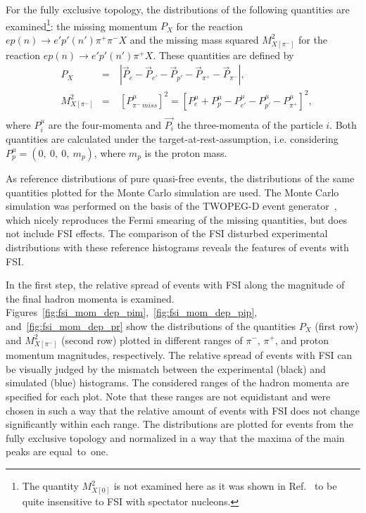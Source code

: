 For the fully exclusive topology, the distributions of the following quantities are examined\footnote[5]{The quantity $M^{2}_{X[0]}$ is not examined here as it was shown in Ref.~\cite{note_mm_distr} to be quite insensitive to FSI with spectator nucleons.}: the missing momentum $P_{X}$ for the reaction $ep(n)\rightarrow e'p'(n')\pi^{+}\pi^{-}X$ and the missing mass squared $M^{2}_{X[\pi^{-}]}$ for the reaction $ep(n)\rightarrow e'p'(n')\pi^{+}X$. These quantities are defined by\vspace{-1.25em}
\begin{equation}
\begin{aligned}
&P_{X}&=&~|\overrightarrow{P}_{e} - \overrightarrow{P}_{e'}- \overrightarrow{P}_{p'} - \overrightarrow{P}_{\pi^{+}} - \overrightarrow{P}_{\pi^{-}}|,\\[-3pt]
&M_{X[\pi^{-}]}^{2}&=&~[P_{\pi^{-}~miss}^{\mu}]^{2}=[P_{e}^{\mu} + P_{p}^{\mu}- P_{e'}^{\mu}- P_{p'}^{\mu}-  P_{\pi^{+}}^{\mu}]^{2},\\[-10pt]
\end{aligned}\label{eq:excl_top_quant2}
\end{equation}%
where $P_{i}^{\mu}$ are the four-momenta and $\overrightarrow{P_{i}}$ the three-momenta of the particle $i$. Both quantities are calculated under the target-at-rest-assumption, i.e. considering $P^{\mu}_{p} = (0,~0,~0,~m_{p})$, where $m_{p}$ is the proton mass.

As reference distributions of pure quasi-free events, the distributions of the same quantities plotted for the Monte Carlo simulation are used. The Monte Carlo simulation was performed on the basis of the TWOPEG-D event generator~\cite{twopeg-d}, which nicely reproduces the Fermi smearing of the missing quantities, but does not include FSI effects. The comparison of the FSI disturbed experimental distributions with these reference histograms reveals the features of events with FSI. 


In the first step, the relative spread of events with FSI along the magnitude of the final hadron momenta is examined. Figures~\ref{fig:fsi_mom_dep_pim},~\ref{fig:fsi_mom_dep_pip}, and~\ref{fig:fsi_mom_dep_pr} show the distributions of the quantities $P_{X}$ (first row) and $M^{2}_{X[\pi^{-}]}$ (second row) plotted in different ranges of $\pi^{-}$, $\pi^{+}$, and proton momentum magnitudes, respectively. The relative spread of events with FSI can be visually judged by the mismatch between the experimental (black) and simulated (blue) histograms. The considered ranges of the hadron momenta are specified for each plot. Note that these ranges are not equidistant and were chosen in such a way that the relative amount of events with FSI does not change significantly within each range. The distributions are plotted for events from the fully exclusive topology and normalized in a way that the maxima of the main peaks are equal~to~one. 

